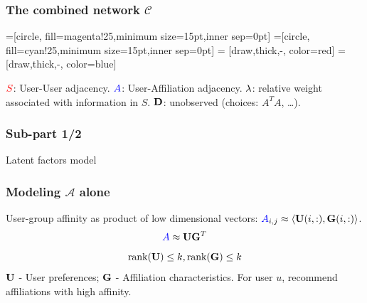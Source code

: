 \documentclass[handout]{beamer}
\begin{document}
\begin{frame}
\frametitle{The combined network $\mathcal{C}$}
=[circle, fill=magenta!25,minimum size=15pt,inner sep=0pt]
=[circle, fill=cyan!25,minimum size=15pt,inner sep=0pt]
 = [draw,thick,-, color=red]
 = [draw,thick,-, color=blue]
\pause
{}
\begin{itemize}
 \pitem $\textcolor{red}{S}$: User-User adjacency.
 \pitem $\textcolor{blue}{A}$: User-Affiliation adjacency.
 \pitem $\lambda$: relative weight associated with information in $S$.
 \pitem $\mathbf{D}$: unobserved (choices: $A^{T}A$, \dots).
\end{itemize}
\end{frame}

\begin{frame}
\frametitle{Sub-part 1/2}
  \hspace{1.1in}
  \centerline{\huge{Latent factors model}}
\end{frame}

\begin{frame}
\frametitle{Modeling $\mathcal{A}$ alone}
\begin{itemize}
\pitem User-group affinity as product of low dimensional vectors: $\textcolor{blue}{A}_{i, j} \approx \langle\mathbf{U}(i, :), \mathbf{G}(i, :)\rangle$.
\pause
\[ \textcolor{blue}{A} \approx \mathbf{U} \mathbf{G}^{T} \] 
\[ \text{rank}(\mathbf{U}) \leq k, \text{rank}(\mathbf{G}) \leq k \]
$\mathbf{U}$ - User preferences; $\mathbf{G}$ - Affiliation characteristics.
\pitem For user $u$, recommend affiliations with high affinity.
\end{itemize}
\end{frame}
\end{document}
